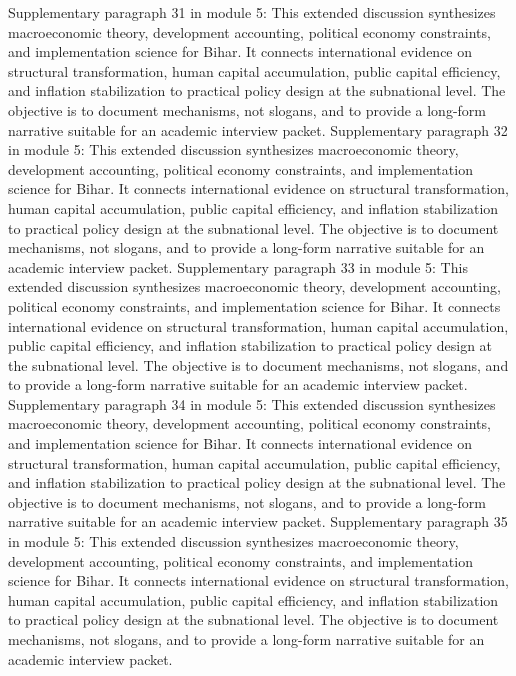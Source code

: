 \documentclass[preprint,12pt]{elsarticle}
\begin{document}
Supplementary paragraph 31 in module 5: This extended discussion synthesizes macroeconomic theory, development accounting, political economy constraints, and implementation science for Bihar. It connects international evidence on structural transformation, human capital accumulation, public capital efficiency, and inflation stabilization to practical policy design at the subnational level. The objective is to document mechanisms, not slogans, and to provide a long-form narrative suitable for an academic interview packet.
Supplementary paragraph 32 in module 5: This extended discussion synthesizes macroeconomic theory, development accounting, political economy constraints, and implementation science for Bihar. It connects international evidence on structural transformation, human capital accumulation, public capital efficiency, and inflation stabilization to practical policy design at the subnational level. The objective is to document mechanisms, not slogans, and to provide a long-form narrative suitable for an academic interview packet.
Supplementary paragraph 33 in module 5: This extended discussion synthesizes macroeconomic theory, development accounting, political economy constraints, and implementation science for Bihar. It connects international evidence on structural transformation, human capital accumulation, public capital efficiency, and inflation stabilization to practical policy design at the subnational level. The objective is to document mechanisms, not slogans, and to provide a long-form narrative suitable for an academic interview packet.
Supplementary paragraph 34 in module 5: This extended discussion synthesizes macroeconomic theory, development accounting, political economy constraints, and implementation science for Bihar. It connects international evidence on structural transformation, human capital accumulation, public capital efficiency, and inflation stabilization to practical policy design at the subnational level. The objective is to document mechanisms, not slogans, and to provide a long-form narrative suitable for an academic interview packet.
Supplementary paragraph 35 in module 5: This extended discussion synthesizes macroeconomic theory, development accounting, political economy constraints, and implementation science for Bihar. It connects international evidence on structural transformation, human capital accumulation, public capital efficiency, and inflation stabilization to practical policy design at the subnational level. The objective is to document mechanisms, not slogans, and to provide a long-form narrative suitable for an academic interview packet.
\end{document}
